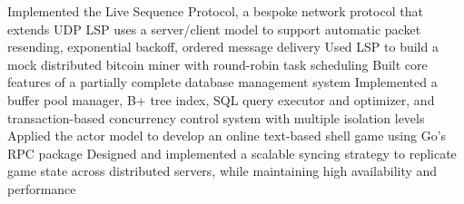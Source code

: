 \documentclass[]{paws}
\begin{document}
{    {Implemented the Live Sequence Protocol, a bespoke network protocol that extends UDP}
    {LSP uses a server/client model to support automatic packet resending, exponential backoff, ordered message delivery}
    {Used LSP to build a mock distributed bitcoin miner with round-robin task scheduling}
    \subsectionbreak{}
    {Built core features of a partially complete database management system}
    {Implemented a buffer pool manager, B+ tree index, SQL query executor and optimizer, and transaction-based concurrency control system with multiple isolation levels}
    \subsectionbreak{}
    {Applied the actor model to develop an online text-based shell game using Go's RPC package}
    {Designed and implemented a scalable syncing strategy to replicate game state across distributed servers, while maintaining high availability and performance}

    

}
\end{document}

